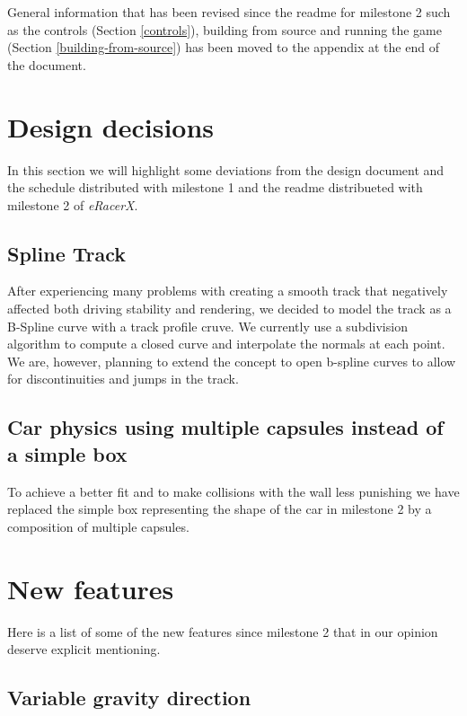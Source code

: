\documentclass[11pt]{article}
\begin{document}
General information that has been revised since the readme for milestone 2 such as the controls (Section \ref{controls}), building from source and running  the game (Section \ref{building-from-source}) has been moved to the appendix at the end of the document. 

\section{Design decisions}
\label{design-decisions}

In this section we will highlight some deviations from the design document and the schedule distributed with milestone 1 and the readme distribueted with milestone 2 of \emph{eRacerX}.

\subsection{Spline Track}

After experiencing many problems with creating a smooth track that negatively affected both driving stability and rendering,
we decided to model the track as a B-Spline curve with a track profile cruve. We currently use a subdivision algorithm to compute a
closed curve and interpolate the normals at each point. We are, however, planning to extend the concept to open b-spline curves 
to allow for discontinuities and jumps in the track. 

\subsection{Car physics using multiple capsules instead of a simple box}

To achieve a better fit and to make collisions with the wall less punishing we have replaced the simple box representing the shape of the car in milestone 2 by a composition of multiple capsules.   


\section{New features}
\label{new-features}

Here is a list of some of the new features since milestone 2 that in our opinion deserve explicit mentioning.

\subsection{Variable gravity direction}
\end{document}

